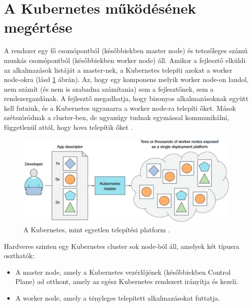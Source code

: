 \section{A Kubernetes működésének megértése}
A rendszer egy fő csomópontból (későbbiekben master node) és tetszőleges számú munkás csomópontból (későbbiekben worker node) áll.
Amikor a fejlesztő elküldi az alkalmazások listáját a master-nek, a Kubernetes telepíti azokat a worker node-okra (lásd \ref{kubernetes-overview} ábrán).
Az, hogy egy komponens melyik worker node-on landol, nem számít (és nem is szabadna számítania) sem a fejlesztőnek, sem a rendszergazdának.
A fejlesztő megadhatja, hogy bizonyos alkalmazásoknak együtt kell futniuk, és a Kubernetes ugyanarra a worker node-ra telepíti őket.
Mások szétszóródnak a cluster-ben, de ugyanúgy tudnak egymással kommunikálni, függetlenül attól, hogy hova telepítik őket \cite{Marko17}.

\begin{figure}[ht]
    \centering
         \includegraphics[width=1.0\textwidth]{figures/kubernetes/kubernetes-overview.png}
          \caption{A Kubernetes, mint egyetlen telepítési platform \cite{Marko17}.}
           \label{kubernetes-overview}
\end{figure}

Hardveres szinten egy Kubernetes cluster sok node-ból áll, amelyek két típusra oszthatók:
\begin{itemize}
    \item A master node, amely a Kubernetes vezérlőjének (későbbiekben Control Plane) ad otthont, amely az egész Kubernetes rendszert irányítja és kezeli.
    \item A worker node, amely a tényleges telepített alkalmazásokat futtatja.
\end{itemize}

